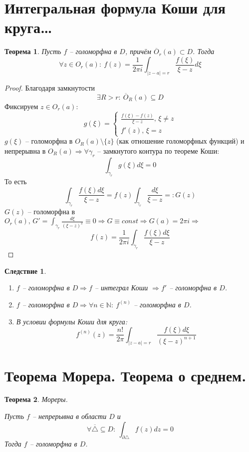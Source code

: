 \documentclass[a4paper,12pt]{article}
\theoremstyle{plain}
\newtheorem{theorem}{Теорема}[section]
\newtheorem*{corollary}{Следствие}
\theoremstyle{definition}
\theoremstyle{remark}
\begin{document}
\section{Интегральная формула Коши для круга\dots}
\begin{theorem}
  Пусть $f$ -- голоморфна в $D$, причём $\overline{O}_r(a) \subset D$. Тогда
  \[
    \forall z \in O_r(a) :\: f(z) = \frac{1}{2\pi i} \int_{\vert z - a\vert = r}\frac{f(\xi)}{\xi - z}d\xi
  \]
\end{theorem}

\begin{proof}
  Благодаря замкнутости
  \[
    \exists R > r :\: \overline{O}_R(a) \subseteq D
  \]
  Фиксируем $z \in O_r(a)$:
  \[
    g(\xi) = \begin{cases}
      \frac{f(\xi) - f(z)}{\xi - z},\, \xi \neq z\\
      f'(z),\, \xi = z
    \end{cases}
  \]
  $g(\xi)$ -- голоморфна в $O_R(a) \setminus \{z\}$ (как отношение голоморфных функций) и непрерывна в $O_R(a) \Rightarrow \forall \gamma_r$ -- замкнутого контура по теореме Коши:
  \[
    \int_{\gamma_r}g(\xi)d\xi = 0
  \] 
  То есть
  \[
    \int_{\gamma_r}\frac{f(\xi)d\xi}{\xi - z} = f(z)\int_{\gamma_r}\frac{d\xi}{\xi - z} =: G(z)
  \]
  $G(z)$ -- голоморфна в $O_r(a),\, G' = \int_{\gamma_r} \frac{d\xi}{(\xi - z)^2} \equiv 0 \Rightarrow G \equiv const \Rightarrow G(a) = 2\pi i \Rightarrow$
  \[
    f(z) = \frac{1}{2\pi i} \int_{\gamma_r}\frac{f(\xi)d\xi}{\xi - z}
  \]
\end{proof}

\begin{corollary}
  \begin{enumerate}
    \item $f$ -- голоморфна в $D \Rightarrow f$ -- интеграл Коши $\Rightarrow f'$ -- голоморфна в $D$.
    \item $f$ -- голоморфна в $D \Rightarrow \forall n \in \mathbb{N} :\: f^{(n)}$ -- голоморфна в $D$.
    \item В условии формулы Коши для круга:
    \[
      f^{(n)}(z) = \frac{n!}{2\pi} \int_{\vert z - a\vert = r} \frac{f(\xi)d\xi}{(\xi - z)^{n + 1}}
    \]
  \end{enumerate}
\end{corollary}

\section{Теорема Морера. Теорема о среднем.}
\begin{theorem}
  Мореры.

  Пусть $f$ -- непрерывна в области $D$ и
  \[
    \forall \overline{\triangle} \subseteq D :\: \int_{\partial \triangle} f(z)dz = 0
  \]
  Тогда $f$ -- голоморфна в $D$.
\end{theorem}
\end{document}
